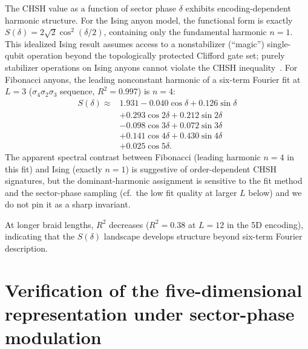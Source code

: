 \documentclass[aps,pra,twocolumn,superscriptaddress,longbibliography,floatfix,nofootinbib]{revtex4-2}
\begin{document}
The CHSH value as a function of sector phase $\delta$ exhibits
encoding-dependent harmonic structure.
For the Ising anyon model, the functional form is exactly
$S(\delta) = 2\sqrt{2}\cos^2(\delta/2)$, containing only the
fundamental harmonic $n=1$. This idealized Ising result assumes
access to a nonstabilizer (``magic'') single-qubit operation beyond
the topologically protected Clifford gate set; purely stabilizer
operations on Ising anyons cannot violate the CHSH
inequality~\cite{HowardVala2012}.
For Fibonacci anyons, the leading nonconstant harmonic of a
six-term Fourier fit at $L=3$ ($\sigma_4\sigma_2\sigma_3$ sequence,
$R^2=0.997$) is $n=4$:
\begin{align}
S(\delta) \approx{} &1.931 - 0.040\cos\delta + 0.126\sin\delta
\nonumber \\
&+ 0.293\cos 2\delta + 0.212\sin 2\delta \nonumber \\
&- 0.098\cos 3\delta + 0.072\sin 3\delta \nonumber \\
&+ 0.141\cos 4\delta + 0.430\sin 4\delta \nonumber \\
&+ 0.025\cos 5\delta.
\label{eq:fourier}
\end{align}
The apparent spectral contrast between Fibonacci (leading harmonic
$n=4$ in this fit) and Ising (exactly $n=1$) is suggestive of
order-dependent CHSH signatures, but the dominant-harmonic
assignment is sensitive to the fit method and the sector-phase
sampling (cf.\ the low fit quality at larger $L$ below) and we do
not pin it as a sharp invariant.

At longer braid lengths, $R^2$ decreases ($R^2=0.38$ at $L=12$
in the 5D encoding), indicating that the $S(\delta)$ landscape
develops structure beyond six-term Fourier description.

\section{Verification of the five-dimensional representation under sector-phase modulation}
\label{app:algebra}
\end{document}
